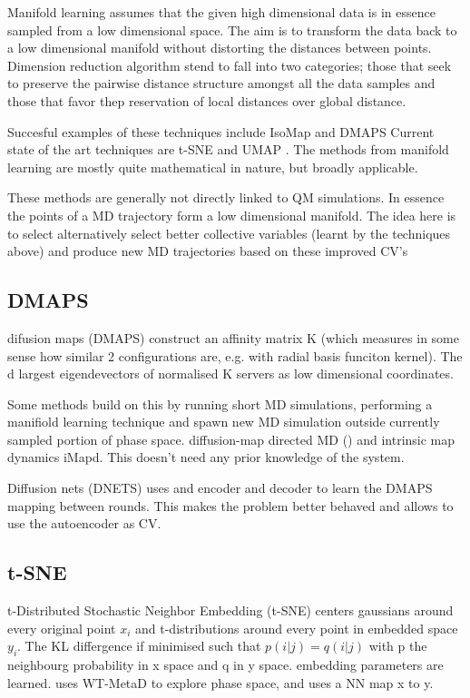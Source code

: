 \documentclass{article}
\begin{document}
Manifold learning assumes that the given high dimensional data is in essence sampled from a low dimensional space. The aim is to transform the data back to a low dimensional manifold without distorting the distances between points. Dimension reduction algorithm stend to fall into two categories; those that seek to preserve the pairwise distance structure amongst all the data samples and those that favor thep reservation of local distances over global distance.\cite{McInnes2018}

Succesful examples of these techniques include IsoMap \cite{Tenenbaum1995} and DMAPS \cite{Coifman2006} Current state of the art techniques are  t-SNE \cite{vanDerMaarten2008} and  UMAP  \cite{McInnes2018}. The methods from manifold learning are mostly quite mathematical in nature, but broadly applicable.

These methods are generally not directly linked to QM simulations. In essence the points of a MD trajectory form a low dimensional manifold. The idea here is to select alternatively select better collective variables (learnt by the techniques above) and produce new MD trajectories based on these improved CV's

\subsection{DMAPS}

difusion maps (DMAPS)\cite{Coifman2006} construct an affinity matrix K (which measures in some sense how similar 2 configurations are, e.g. with radial basis funciton kernel). The d largest eigendevectors of normalised K servers as low dimensional coordinates.

Some methods build on this by running short MD simulations, performing a manifiold learning technique and spawn new MD simulation outside currently sampled portion of phase space. diffusion-map directed MD (\cite{Preto2014}) and intrinsic map dynamics iMapd\cite{Chiavazzo2017}. This doesn't need any prior knowledge of the system.

Diffusion nets (DNETS) \cite{Mishne2015} uses and encoder and decoder to learn the DMAPS mapping between rounds. This makes the problem better behaved and allows to use the autoencoder as CV.

\subsection{t-SNE}
t-Distributed Stochastic Neighbor Embedding (t-SNE) \cite{vanDerMaarten2008} centers gaussians around every original point $x_i$ and t-distributions around every point in embedded space $y_i$. The KL differgence if minimised such that $p(i|j) = q(i|j)$ with p the neighbourg probability in x space and q in y space. embedding parameters are learned. \cite{Rydzewski2021} uses WT-MetaD to explore phase space, and uses a NN  map x to y.
\end{document}
